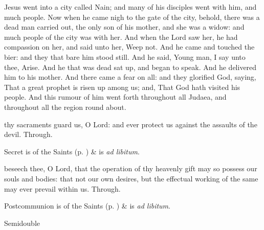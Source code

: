
 Jesus went into a city called Nain; and many of his disciples went with him, and much people. Now when he came nigh to the gate of the city, behold, there was a dead man carried out, the only son of his mother, and she was a widow: and much people of the city was with her. And when the Lord saw her, he had compassion on her, and said unto her, Weep not. And he came and touched the bier: and they that bare him stood still. And he said, Young man, I say unto thee, Arise. And he that was dead sat up, and began to speak. And he delivered him to his mother. And there came a fear on all: and they glorified God, saying, That a great prophet is risen up among us; and, That God hath visited his people. And this rumour of him went forth throughout all Judaea, and throughout all the region round about.


\secret
{} thy sacraments guard us, O Lord: and ever protect us against the assaults of the devil. Through.
\begin{rubric}
     Secret is of the Saints (p. \pageref{SPSaints}) \&  is \emph{ad libitum}.
\end{rubric}


\postcommunion
{} beseech thee, O Lord, that the operation of thy heavenly gift may so possess our souls and bodies: that not our own desires, but the effectual working of the same may ever prevail within us. Through.
\begin{rubric}
     Postcommunion is of the Saints (p. \pageref{SPSaints}) \&  is \emph{ad libitum}.
\end{rubric}

\clearpage

\begin{inhead}
{Semidouble}
\end{inhead}

